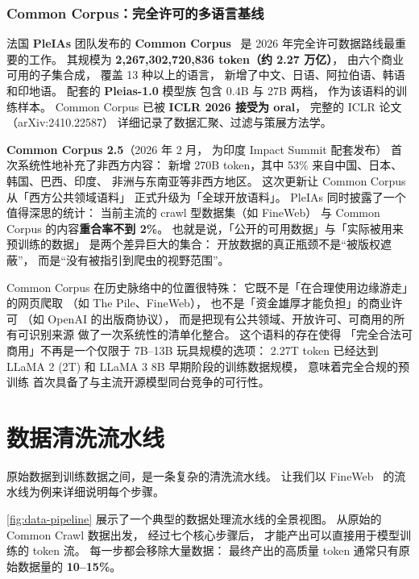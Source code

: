 \subsubsection{Common Corpus：完全许可的多语言基线}

法国 \textbf{PleIAs} 团队发布的 \textbf{Common Corpus}~\cite{pleias2026commoncorpus}
是 2026 年完全许可数据路线最重要的工作。
其规模为
\textbf{2,267,302,720,836 token（约 2.27 万亿）}，
由六个商业可用的子集合成，
覆盖 13 种以上的语言，
新增了中文、日语、阿拉伯语、韩语和印地语。
配套的 \textbf{Pleias-1.0} 模型族
包含 0.4B 与 27B 两档，
作为该语料的训练样本。
Common Corpus 已被
\textbf{ICLR 2026 接受为 oral}，
完整的 ICLR 论文（arXiv:2410.22587）
详细记录了数据汇聚、过滤与策展方法学。

\textbf{Common Corpus 2.5}（2026 年 2 月，
为印度 Impact Summit 配套发布）
首次系统性地补充了非西方内容：
新增 270B token，其中 53\% 来自中国、日本、韩国、巴西、印度、
非洲与东南亚等非西方地区。
这次更新让 Common Corpus 从「西方公共领域语料」
正式升级为「全球开放语料」。
PleIAs 同时披露了一个值得深思的统计：
当前主流的 crawl 型数据集（如 FineWeb）
与 Common Corpus 的内容\textbf{重合率不到 2\%}。
也就是说，「公开的可用数据」与「实际被用来预训练的数据」
是两个差异巨大的集合：
开放数据的真正瓶颈不是“被版权遮蔽”，
而是“没有被指引到爬虫的视野范围”。

Common Corpus 在历史脉络中的位置很特殊：
它既不是「在合理使用边缘游走」的网页爬取
（如 The Pile、FineWeb），
也不是「资金雄厚才能负担」的商业许可
（如 OpenAI 的出版商协议），
而是把现有公共领域、开放许可、可商用的所有可识别来源
做了一次系统性的清单化整合。
这个语料的存在使得
「完全合法可商用」不再是一个仅限于 7B--13B 玩具规模的选项：
2.27T token 已经达到
LLaMA 2 (2T) 和 LLaMA 3 8B 早期阶段的训练数据规模，
意味着完全合规的预训练
首次具备了与主流开源模型同台竞争的可行性。

\section{数据清洗流水线}

原始数据到训练数据之间，是一条复杂的清洗流水线。
让我们以 FineWeb~\cite{penedo2024fineweb} 的流水线为例来详细说明每个步骤。

\cref{fig:data-pipeline} 展示了一个典型的数据处理流水线的全景视图。
从原始的 Common Crawl 数据出发，
经过七个核心步骤后，
才能产出可以直接用于模型训练的 token 流。
每一步都会移除大量数据：
最终产出的高质量 token 通常只有原始数据量的 \textbf{10--15\%}。


